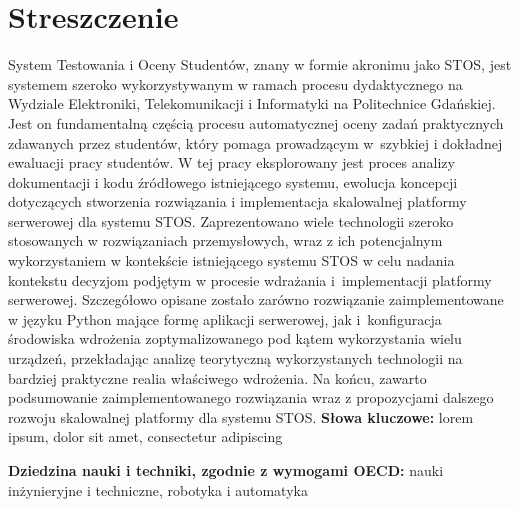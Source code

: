 \chapter*{Streszczenie}
\indent System Testowania i Oceny Studentów, znany w formie akronimu jako STOS, jest systemem szeroko wykorzystywanym w ramach procesu dydaktycznego na Wydziale Elektroniki, Telekomunikacji i Informatyki na Politechnice Gdańskiej. Jest on fundamentalną częścią procesu automatycznej oceny zadań praktycznych zdawanych przez studentów, który pomaga prowadzącym w~szybkiej i dokładnej ewaluacji pracy studentów. 
\newline \noindent W tej pracy eksplorowany jest proces analizy dokumentacji i kodu źródłowego istniejącego systemu, ewolucja koncepcji dotyczących stworzenia rozwiązania i implementacja skalowalnej platformy serwerowej dla systemu STOS. Zaprezentowano wiele technologii szeroko stosowanych w rozwiązaniach przemysłowych, wraz z ich potencjalnym wykorzystaniem w kontekście istniejącego systemu STOS w celu nadania kontekstu decyzjom podjętym w procesie wdrażania i~implementacji platformy serwerowej. Szczegółowo opisane zostało zarówno rozwiązanie zaimplementowane w języku Python mające formę aplikacji serwerowej, jak i~konfiguracja środowiska wdrożenia zoptymalizowanego pod kątem wykorzystania wielu urządzeń, przekładając analizę teorytyczną wykorzystanych technologii na bardziej praktyczne realia właściwego wdrożenia. Na końcu, zawarto podsumowanie zaimplementowanego rozwiązania wraz z propozycjami dalszego rozwoju skalowalnej platformy dla systemu STOS.
\vspace{0.5cm}\newline
\textbf{Słowa kluczowe:} lorem ipsum, dolor sit amet, consectetur adipiscing\vspace{0.5cm}

\noindent \textbf{Dziedzina nauki i techniki, zgodnie z wymogami OECD:} nauki inżynieryjne i techniczne, robotyka i automatyka
